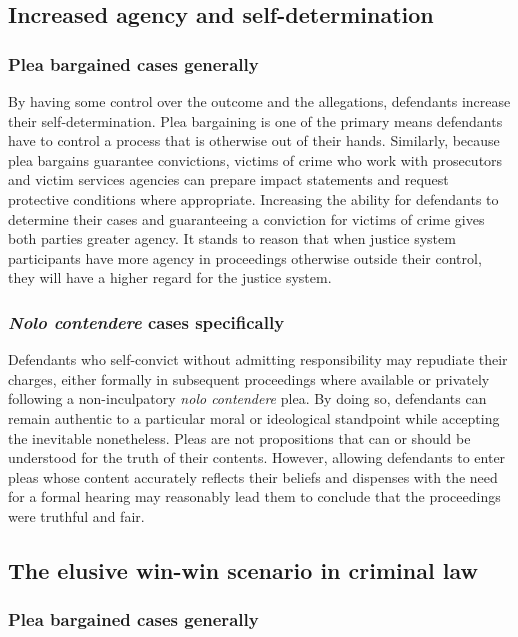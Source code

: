 \subsection{Increased agency and self-determination}

\subsubsection{Plea bargained cases generally}

By having some control over the outcome and the allegations, defendants increase their self-determination. Plea bargaining is one of the primary means defendants have to control a process that is otherwise out of their hands. Similarly, because plea bargains guarantee convictions, victims of crime who work with prosecutors and victim services agencies can prepare impact statements and request protective conditions where appropriate. Increasing the ability for defendants to determine their cases and guaranteeing a conviction for victims of crime gives both parties greater agency. It stands to reason that when justice system participants have more agency in proceedings otherwise outside their control, they will have a higher regard for the justice system.

\subsubsection{\textit{Nolo contendere} cases specifically}

Defendants who self-convict without admitting responsibility may repudiate their charges, either formally in subsequent proceedings where available or privately following a non-inculpatory \textit{nolo contendere} plea. By doing so, defendants can remain authentic to a particular moral or ideological standpoint while accepting the inevitable nonetheless. Pleas are not propositions that can or should be understood for the truth of their contents. However, allowing defendants to enter pleas whose content accurately reflects their beliefs and dispenses with the need for a formal hearing may reasonably lead them to conclude that the proceedings were truthful and fair. 

\subsection{The elusive win-win scenario in criminal law}

\subsubsection{Plea bargained cases generally}

